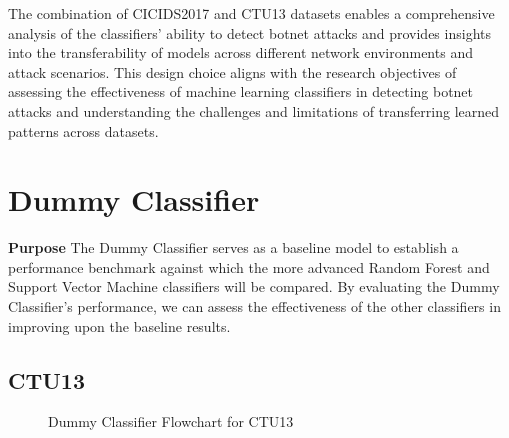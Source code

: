 The combination of CICIDS2017 and CTU13 datasets enables a comprehensive analysis of the classifiers' ability to detect botnet attacks and provides insights into the transferability of models across different network environments and attack scenarios. This design choice aligns with the research objectives of assessing the effectiveness of machine learning classifiers in detecting botnet attacks and understanding the challenges and limitations of transferring learned patterns across datasets.

\section{Dummy Classifier}\label{sec:DummyClassifier}

\textbf{Purpose} The Dummy Classifier serves as a baseline model to establish a performance benchmark against which the more advanced Random Forest and Support Vector Machine classifiers will be compared. By evaluating the Dummy Classifier's performance, we can assess the effectiveness of the other classifiers in improving upon the baseline results.

\subsection{CTU13}

\begin{figure}[H]
\centering
{}
\caption{Dummy Classifier Flowchart for CTU13}\label{fig:DummyRandomFlowCTU13}
\end{figure}

